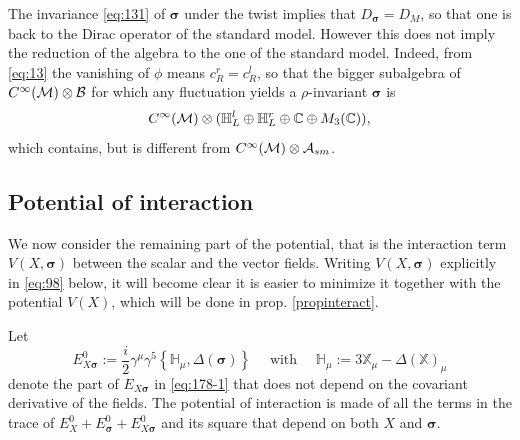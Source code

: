\documentclass[11pt]{article}
\newcommand{\cinf}{{C^\infty({\cal M})}}
\newcommand{\A}{\mathcal A}
\newcommand{\sig}{{\boldsymbol{\sigma}}}
\newcommand{\XX}{{\mathbb X}}
\begin{document}
The invariance \eqref{eq:131} of $\sig$ under the twist implies that
$D_\sig =D_M$, so that one is back to the Dirac operator 
of  the standard model. However this does not imply the
  reduction of the algebra to the one of the standard model. Indeed,
from \eqref{eq:13} the vanishing of $\phi$ means $c_R^r =c_R^l$,
  so that the bigger subalgebra of
  $\cinf\otimes \cal B$ for which any fluctuation yields a
  $\rho$-invariant $\sig$ is 
  \begin{equation}
    \label{eq:52}
    \cinf\otimes ({\mathbb H}_L^l \oplus {\mathbb H}_L^r \oplus {\mathbb C}
    \oplus M_3({\mathbb C})),
  \end{equation}
which contains, but is different from
  $\cinf\otimes \A_{sm}$.

\subsection{Potential of interaction}
\label{interaction}

We now consider the remaining part of the potential, that is the
interaction term $V(X,\sig)$ between the scalar and the vector fields. Writing
$V(X,\sig)$ explicitly in \eqref{eq:98} below, it will become clear it
is easier to minimize it together with the potential $V(X)$,
which will be done in prop. \ref{propinteract}.

Let 
\begin{equation}
  \label{eq:24}
  E_{X\sig}^0:=  \frac i2 \gamma^\mu\gamma^5\left\{ {\mathbb H}_\mu,
    \Delta(\sig)\right\}\quad\text{ with } \quad {\mathbb H}_\mu:=3\XX_\mu -\Delta(\XX)_\mu
\end{equation}
denote the part  of $E_{X\sig}$ in \eqref{eq:178-1} that does not depend on the covariant
derivative of the fields. The potential of interaction is made of all the terms in the trace of
$E^0_X+ E^0_\sig + E^0_{X\sig}$ and its square that depend on both $X$ and
$\sig$.  
\end{document}
